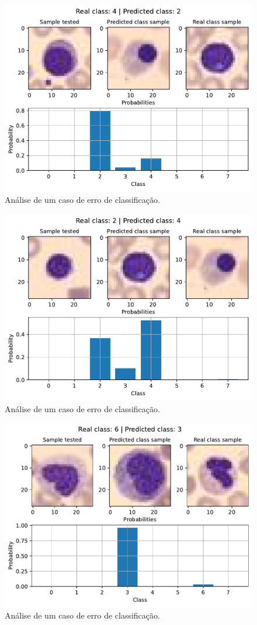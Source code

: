 \begin{figure}[H]
\centering
\includegraphics[width=0.75\linewidth]{../../plot/cnn_deep/error_analyser_187}
\caption{Análise de um caso de erro de classificação.}
\label{fig:error_analyser_187}
\end{figure}

\begin{figure}[H]
\centering
\includegraphics[width=0.75\linewidth]{../../plot/cnn_deep/error_analyser_259}
\caption{Análise de um caso de erro de classificação.}
\label{fig:error_analyser_259}
\end{figure}

\begin{figure}[H]
\centering
\includegraphics[width=0.75\linewidth]{../../plot/cnn_deep/error_analyser_35}
\caption{Análise de um caso de erro de classificação.}
\label{fig:error_analyser_35_cnn_deep}
\end{figure}

